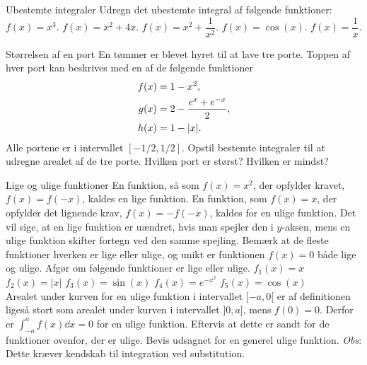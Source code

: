 \begin{opgave}[1]{Ubestemte integraler}
	Udregn det ubestemte integral af følgende funktioner:
	\opg $f(x) = x^3$.
	\opg $f(x) = x^2 + 4x$.
	\opg $f(x) = x^2 + \dfrac{1}{x^2}$.
	\opg $f(x) = \cos (x)$.
	\opg $f(x) = \dfrac{1}{x}$.
\end{opgave}
\begin{opgave}[2]{Størrelsen af en port}
    En tømmer er blevet hyret til at lave tre porte.
    Toppen af hver port kan beskrives med en af de følgende funktioner
    \begin{align*}
        f(x)&=1-x^2,\\
        g(x)&=2-\frac{e^x+e^{-x}}{2},\\
        h(x) &= 1-\abs{x}.        
    \end{align*}
    Alle portene er i intervallet $[-1/2,1/2]$.
    \opg Opstil bestemte integraler til at udregne arealet af de tre porte.
    \opg Hvilken port er størst?
    \opg Hvilken er mindst?
\end{opgave}
\begin{opgave}[4]{Lige og ulige funktioner} \label{opg:lige/ulige}%
En funktion, så som $f(x) = x^2$, der opfylder kravet, $f(x) = f(-x)$, kaldes en lige funktion. En funktion, som $f(x) = x$, der opfylder det lignende krav, $f(x)=-f(-x)$, kaldes for en ulige funktion.
Det vil sige, at en lige funktion er uændret, hvis man spejler den i $y$-aksen, mens en ulige funktion skifter fortegn ved den samme spejling.
Bemærk at de fleste funktioner hverken er lige eller ulige, og unikt er funktionen $f(x) = 0$ både lige og ulige.
Afgør om følgende funktioner er lige eller ulige.
\opg $f_1(x) = x$
\opg $f_2(x) = |x|$
\opg $f_3(x) = \sin(x)$
\opg $f_4(x) = e^{-x^2}$
\opg $f_5(x) = \cos(x)$ \\[2mm]
Arealet under kurven for en ulige funktion i intervallet $[-a,0[$ er af definitionen ligeså stort som arealet under kurven i intervallet $]0,a]$, mens $f(0)=0$. Derfor er $\int_{-a}^{a}f(x)\dd{x} = 0$ for en ulige funktion.
\opg Eftervis at dette er sandt for de funktioner ovenfor, der er ulige.
\opg Bevis udsagnet for en generel ulige funktion. \emph{Obs}: Dette kræver kendskab til integration ved substitution.
\end{opgave}
